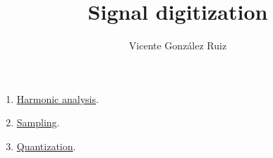 \title{Signal digitization}
\author{Vicente González Ruiz}

\maketitle

\begin{enumerate}
\item \href{https://cdn.rawgit.com/vicente-gonzalez-ruiz/harmonic_analysis/master/index.html}{Harmonic analysis}.
  \item \href{https://cdn.rawgit.com/vicente-gonzalez-ruiz/sampling/master/index.html}{Sampling}.
  \item \href{https://cdn.rawgit.com/vicente-gonzalez-ruiz/quantization/master/index.html}{Quantization}.
\end{enumerate}



